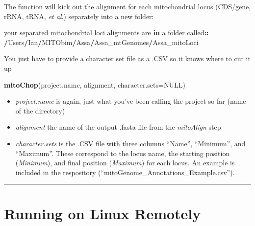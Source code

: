 \documentclass[
]{article}
\newenvironment{Shaded}{\begin{snugshade}}{\end{snugshade}}
\newcommand{\ControlFlowTok}[1]{\textcolor[rgb]{0.13,0.29,0.53}{\textbf{#1}}}
\newcommand{\DataTypeTok}[1]{\textcolor[rgb]{0.13,0.29,0.53}{#1}}
\newcommand{\ErrorTok}[1]{\textcolor[rgb]{0.64,0.00,0.00}{\textbf{#1}}}
\newcommand{\KeywordTok}[1]{\textcolor[rgb]{0.13,0.29,0.53}{\textbf{#1}}}
\newcommand{\NormalTok}[1]{#1}
\newcommand{\OperatorTok}[1]{\textcolor[rgb]{0.81,0.36,0.00}{\textbf{#1}}}
\newcommand{\OtherTok}[1]{\textcolor[rgb]{0.56,0.35,0.01}{#1}}
\newcommand{\StringTok}[1]{\textcolor[rgb]{0.31,0.60,0.02}{#1}}
\providecommand{\tightlist}{%
  \setlength{\itemsep}{0pt}\setlength{\parskip}{0pt}}
\begin{document}
The function will kick out the alignment for each mitochondrial locus
(CDS/gene, rRNA, tRNA, \emph{et al}.) separately into a new folder:

\begin{Shaded}
\begin{Highlighting}[]
\NormalTok{your separated mitochondrial loci alignments are }\ControlFlowTok{in}\NormalTok{ a folder called}\OperatorTok{::}
\StringTok{ }\ErrorTok{/}\NormalTok{Users}\OperatorTok{/}\NormalTok{Ian}\OperatorTok{/}\NormalTok{MITObim}\OperatorTok{/}\NormalTok{Assa}\OperatorTok{/}\NormalTok{Assa_mtGenomes}\OperatorTok{/}\NormalTok{Assa_mitoLoci}
\end{Highlighting}
\end{Shaded}

You just have to provide a character set file as a .CSV so it knows
where to cut it up

\begin{Shaded}
\begin{Highlighting}[]
\KeywordTok{mitoChop}\NormalTok{(project.name, alignment, }\DataTypeTok{character.sets=}\OtherTok{NULL}\NormalTok{)}
\end{Highlighting}
\end{Shaded}

\begin{itemize}
\tightlist
\item
  \emph{project.name} is again, just what you've been calling the
  project so far (name of the directory)\\
\item
  \emph{alignment} the name of the output .fasta file from the
  \emph{mitoAlign} step\\
\item
  \emph{character.sets} is the .CSV file with three columns ``Name'',
  ``Minimum'', and ``Maximum''. These correspond to the locus name, the
  starting position (\emph{Minimum}), and final position
  (\emph{Maximum}) for each locus. An example is included in the
  respository (``mitoGenome\_Annotations\_Example.csv'').
\end{itemize}

\begin{center}\rule{0.5\linewidth}{0.5pt}\end{center}

\pagebreak

\hypertarget{running-on-linux-remotely}{%
\section{Running on Linux Remotely}\label{running-on-linux-remotely}}
\end{document}
